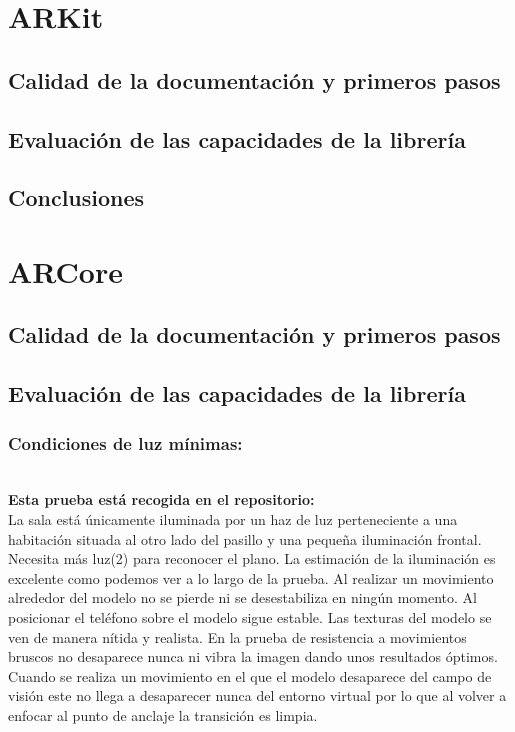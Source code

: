 \section{ARKit}
\subsection{Calidad de la documentación y primeros pasos}

\subsection{Evaluación de las capacidades de la librería}

\subsection{Conclusiones}

\section{ARCore}
\subsection{Calidad de la documentación y primeros pasos}

\subsection{Evaluación de las capacidades de la librería}
\subsubsection{Condiciones de luz mínimas:}\\
\textbf{Esta prueba está recogida en el repositorio:}\\
La sala está únicamente iluminada por un haz de luz perteneciente a una habitación situada al otro lado del pasillo y una pequeña iluminación frontal.\\
Necesita más luz(2) para reconocer el plano. La estimación de la iluminación es excelente como podemos ver a lo largo de la prueba. Al realizar un movimiento alrededor del modelo no se pierde ni se desestabiliza en ningún momento. Al posicionar el teléfono sobre el modelo sigue estable. Las texturas del modelo se ven de manera nítida y realista. En la prueba de resistencia a movimientos bruscos no desaparece nunca ni vibra la imagen dando unos resultados óptimos. Cuando se realiza un movimiento en el que el modelo desaparece del campo de visión este no llega a desaparecer nunca del entorno virtual por lo que al volver a enfocar al punto de anclaje la transición es limpia.


